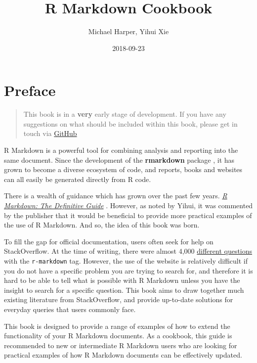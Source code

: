 \documentclass[]{book}
\title{R Markdown Cookbook}
\author{Michael Harper, Yihui Xie}
\date{2018-09-23}
\theoremstyle{definition}
\theoremstyle{definition}
\theoremstyle{definition}
\theoremstyle{remark}
\begin{document}
\maketitle

{
\setcounter{tocdepth}{1}
\tableofcontents
}
\hypertarget{preface}{%
\chapter*{Preface}\label{preface}}

\begin{quote}
This book is in a \textbf{very} early stage of development. If you have
any suggestions on what should be included within this book, please get
in touch via
\href{https://github.com/mikey-harper/rmarkdown-cookbook}{GitHub}
\end{quote}

R Markdown is a powerful tool for combining analysis and reporting into
the same document. Since the development of the \textbf{rmarkdown}
package \citep{R-rmarkdown}, it has grown to become a diverse ecosystem
of code, and reports, books and websites can all easily be generated
directly from R code.

There is a wealth of guidance which has grown over the past few years.
\href{https://bookdown.org/yihui/rmarkdown/}{\emph{R Markdown: The
Definitive Guide}} \citep{xie2018}. However, as noted by Yihui, it was
commented by the publisher that it would be beneficial to provide more
practical examples of the use of R Markdown. And so, the idea of this
book was born.

To fill the gap for official documentation, users often seek for help on
StackOverflow. At the time of writing, there were almost 4,000
\href{https://stackoverflow.com/questions/tagged/r-markdown}{different
questions} with the \texttt{r-markdown} tag. However, the use of the
website is relatively difficult if you do not have a specific problem
you are trying to search for, and therefore it is hard to be able to
tell what is possible with R Markdown unless you have the insight to
search for a specific question. This book aims to draw together much
existing literature from StackOverflow, and provide up-to-date solutions
for everyday queries that users commonly face.

This book is designed to provide a range of examples of how to extend
the functionality of your R Markdown documents. As a cookbook, this
guide is recommended to new or intermediate R Markdown users who are
looking for practical examples of how R Markdown documents can be
effectively updated.
\end{document}
